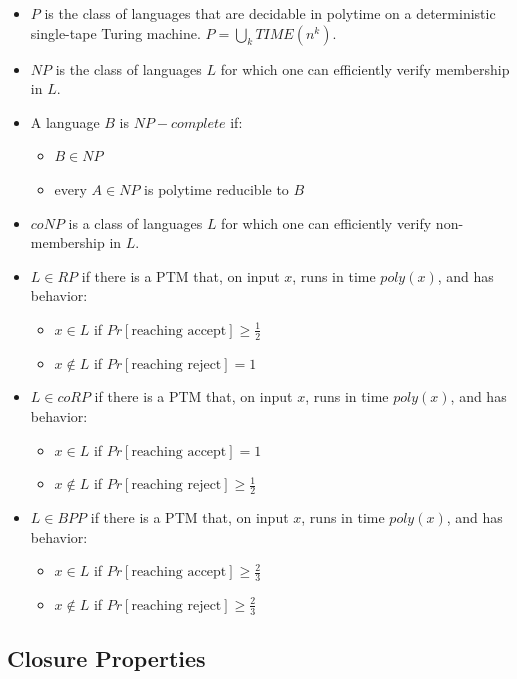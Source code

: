 \documentclass[10pt,landscape,a4paper]{article}
\begin{document}
\begin{multicols*}{3}
\begin{itemize}
    \item $P$ is the class of languages that are decidable in polytime on a deterministic single-tape Turing machine. $P = \bigcup\limits_{k} TIME(n^k)$.
    \item $NP$ is the class of languages $L$ for which one can efficiently verify membership in $L$.
    \item A language $B$ is $NP-complete$ if:
    \begin{itemize}
        \item $B \in NP$
        \item every $A \in NP$ is polytime reducible to $B$
    \end{itemize}
    \item $coNP$ is a class of languages $L$ for which one can efficiently verify non-membership in $L$.
    \item $L \in RP$ if there is a PTM that, on input $x$, runs in time $poly(x)$, and has behavior:
    \begin{itemize}
        \item $x \in L$ if $Pr[\text{reaching accept}] \geq \frac{1}{2}$
        \item $x \notin L$ if $Pr[\text{reaching reject}] = 1$
    \end{itemize}
    \item $L \in coRP$ if there is a PTM that, on input $x$, runs in time $poly(x)$, and has behavior:
    \begin{itemize}
        \item $x \in L$ if $Pr[\text{reaching accept}] = 1$
        \item $x \notin L$ if $Pr[\text{reaching reject}] \geq \frac{1}{2}$
    \end{itemize}
    \item $L \in BPP$ if there is a PTM that, on input $x$, runs in time $poly(x)$, and has behavior:
    \begin{itemize}
        \item $x \in L$ if $Pr[\text{reaching accept}] \geq \frac{2}{3}$
        \item $x \notin L$ if $Pr[\text{reaching reject}] \geq \frac{2}{3}$
    \end{itemize}
\end{itemize}

\subsection{Closure Properties}


\end{multicols*}
\end{document}
